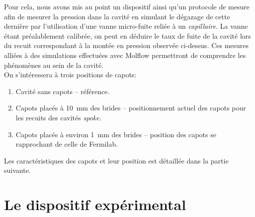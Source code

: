 Pour cela, nous avons mis au point un dispositif ainsi qu'un protocole de mesure afin de mesurer la pression dans la cavité en simulant le dégazage de cette dernière par l'utilisation d'une vanne micro-fuite reliée à un \textit{capillaire}. La vanne étant préalablement calibrée, on peut en déduire le taux de fuite de la cavité lors du recuit correspondant à la montée en pression observée ci-dessus. Ces mesures alliées à des simulations effectuées avec Molflow permettront de comprendre les phénomènes au sein de la cavité.\\

On s'intéressera à trois positions de capots:
\begin{enumerate}
    \item Cavité sans capots -- référence.
    \item Capots placés à \SI{10}{\milli\meter} des brides -- positionnement actuel des capots pour les recuits des cavités \textit{spoke}.
    \item Capots placés à environ \SI{1}{\milli\meter} des brides -- position des capots se rapprochant de celle de Fermilab\cite{grasselinoNinfusion}.
\end{enumerate}

Les caractéristiques des capots et leur position est détaillée dans la partie suivante.

\chapter{Le dispositif expérimental}
